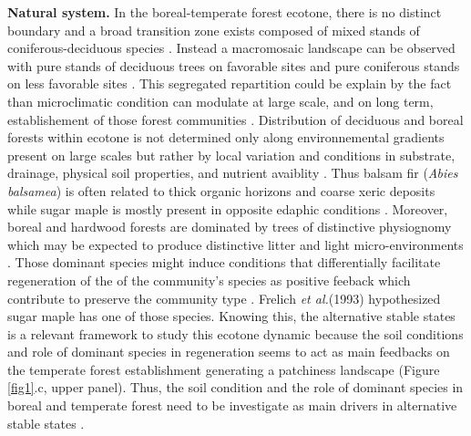 \textbf{Natural system.} In the boreal-temperate forest ecotone, there is no
distinct boundary and a broad transition zone exists composed of mixed stands
of coniferous-deciduous species \cite{Goldblum2010}. Instead a macromosaic
landscape can be observed with pure stands of deciduous trees on favorable
sites and pure coniferous stands on less favorable sites \cite{Goldblum2010}.
This segregated repartition could be explain by the fact than microclimatic
condition can modulate at large scale, and on long term, establishement of
those forest communities \cite{DeFrenne2013}. Distribution of deciduous and
boreal forests within ecotone is not determined only along environnemental
gradients present on large scales but rather by local variation and conditions
in substrate, drainage, physical soil properties, and nutrient avaiblity
\cite{Goldblum2010,Society2014}.  Thus balsam fir (\textit{Abies balsamea}) is
often related to thick organic horizons and coarse xeric deposits while sugar
maple is mostly present in opposite edaphic conditions
\cite{Messaoud2007,Kellman2004,Barras1998}. Moreover, boreal and hardwood
forests are dominated by trees of distinctive physiognomy which may be
expected to produce distinctive litter and light micro-environments
\cite{Barras1998}. Those dominant species might induce conditions that
differentially facilitate regeneration of the of the community’s species as
positive feeback which contribute to preserve the community type
\cite{Barras1998}. Frelich \textit{et al.}(1993) \cite{Society2014}
hypothesized sugar maple has one of those species.  Knowing this, the alternative
stable states is a relevant framework to study this ecotone dynamic because
the soil conditions and role of dominant species in regeneration seems to act
as main feedbacks on the temperate forest establishment generating a
patchiness landscape (Figure \ref{fig1}.c, upper panel). Thus, the soil
condition and the role of dominant species in boreal and temperate forest need
to be investigate as main drivers in alternative stable states
\cite{Kellman2004,Moore2008,DeFrenne2013,Barras1998}.


